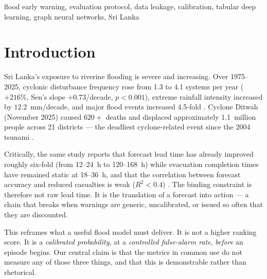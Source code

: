 \documentclass[conference]{IEEEtran}
\begin{document}
\begin{IEEEkeywords}
flood early warning, evaluation protocol, data leakage, calibration, tabular deep
learning, graph neural networks, Sri Lanka
\end{IEEEkeywords}

\section{Introduction}

Sri Lanka's exposure to riverine flooding is severe and increasing. Over
1975--2025, cyclonic disturbance frequency rose from 1.3 to 4.1 systems per year
($+216\%$, Sen's slope $+0.73$/decade, $p<0.001$), extreme rainfall intensity
increased by $12.2$~mm/decade, and major flood events increased 4.5-fold
\cite{partheepan2026}. Cyclone Ditwah (November 2025) caused $620+$ deaths and
displaced approximately 1.1~million people across 21 districts --- the deadliest
cyclone-related event since the 2004 tsunami \cite{partheepan2026}.

Critically, the same study reports that forecast lead time has already improved
roughly six-fold (from 12--24~h to 120--168~h) while evacuation completion times
have remained static at 18--36~h, and that the correlation between forecast
accuracy and reduced casualties is weak ($R^2 < 0.4$) \cite{partheepan2026}. The
binding constraint is therefore not raw lead time. It is the translation of a
forecast into action --- a chain that breaks when warnings are generic,
uncalibrated, or issued so often that they are discounted.

This reframes what a useful flood model must deliver. It is not a higher ranking
score. It is a \emph{calibrated probability}, at a \emph{controlled false-alarm
rate}, \emph{before} an episode begins. Our central claim is that the metrics in
common use do not measure any of those three things, and that this is
demonstrable rather than rhetorical.
\end{document}
